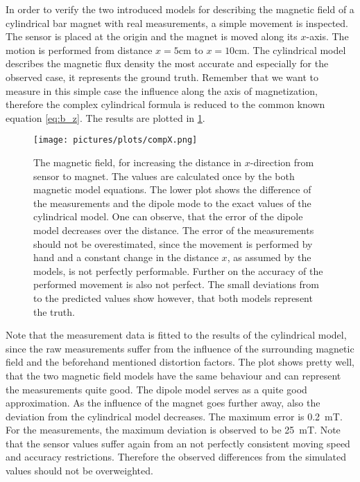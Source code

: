 In order to verify the two introduced models for describing the magnetic field of a cylindrical bar magnet with real measurements, a simple movement is inspected. The sensor is placed at the origin and the magnet is moved along its $ x $-axis. The motion is performed from distance $ x=5\si{\cm} $ to $ x=10\si{\cm} $. The cylindrical model describes the magnetic flux density the most accurate and especially for the observed case, it represents the ground truth. Remember that we want to measure in this simple case the influence along the axis of magnetization, therefore the complex cylindrical formula is reduced to the common known equation \ref{eq:b_z}. The results are plotted in \ref{fig:modCompFlat}.
\begin{figure}[h]
\centering
\texttt{[image: pictures/plots/compX.png]}
\caption[Comparing the models and sensor measurements for flat movement]
{The magnetic field, for increasing the distance in $ x $-direction from sensor to magnet. The values are calculated once by the both magnetic model equations. The lower plot shows the difference of the measurements and the dipole mode to the exact values of the cylindrical model. One can observe, that the error of the dipole model decreases over the distance. The error of the measurements should not be overestimated, since the movement is performed by hand and a constant change in the distance $ x $, as assumed by the models, is not perfectly performable. Further on the accuracy of the performed movement is also not perfect. The small deviations from to the predicted values show however, that both models represent the truth.}
\label{fig:modCompFlat}
\end{figure}
Note that the measurement data is fitted to the results of the cylindrical model, since the raw measurements suffer from the influence of the surrounding magnetic field and the beforehand mentioned distortion factors. The plot shows pretty well, that the two magnetic field models have the same behaviour and can represent the measurements quite good. The dipole model serves as a quite good approximation. As the influence of the magnet goes further away, also the deviation from the cylindrical model decreases. The maximum error is \SI{0.2}{\milli \tesla}. For the measurements, the maximum deviation is observed to be \SI{25}{\milli \tesla}. Note that the sensor values suffer again from an not perfectly consistent moving speed and accuracy restrictions. Therefore the observed differences from the simulated values should not be overweighted.

